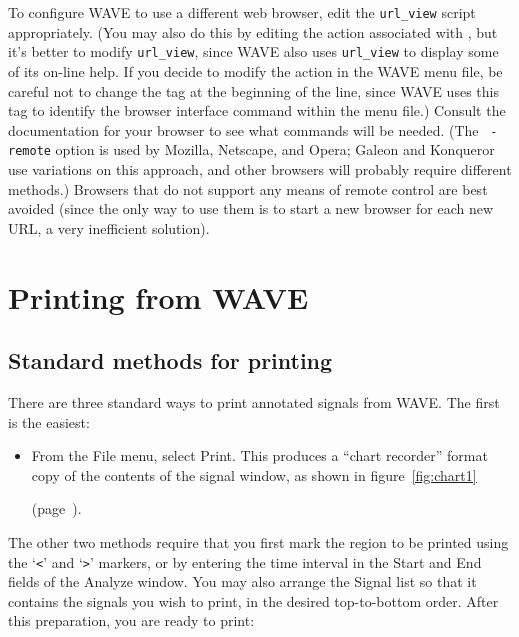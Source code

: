 \documentclass[twoside]{book}
\newcommand{\WAVE}{{\sf WAVE}\xspace}
\begin{document}
To configure \WAVE{} to use a different web browser, edit the {\tt url\_view}
script appropriately.  (You may also do this by editing the action associated
with {\tt <Open URL>}, but it's better to modify {\tt url\_view}, since \WAVE{}
also uses {\tt url\_view} to display some of its on-line help.  If you decide
to modify the action in the \WAVE{} menu file, be careful not to change the
{\tt <Open URL>} tag at the beginning of the line, since \WAVE{} uses this tag
to identify the browser interface command within the menu file.)  Consult the
documentation for your browser to see what commands will be needed.  (The {\tt
-remote} option is used by Mozilla, Netscape, and Opera;  Galeon and
Konqueror use variations on this approach, and other browsers will
probably require different methods.)  Browsers that do not support any means of
remote control are best avoided (since the only way to use them is to start a
new browser for each new URL, a very inefficient solution).

\chapter{Printing from \WAVE{}}

\label{ch:printing}
\section{Standard methods for printing}
There are three standard ways to print annotated signals from \WAVE{}.
The first is the easiest:

\begin{itemize}
\item
From the {\sf File} menu, select {\sf Print}.  This produces a ``chart
recorder'' format copy of the contents of the signal window, as shown
in figure~\ref{fig:chart1}
\begin{latexonly}
(page~\pageref{fig:chart1}).
\end{latexonly}
\end{itemize}

The other two methods require that you first mark the region to be
printed using the `{\tt <}' and `{\tt >}' markers, or by entering the
time interval in the {\sf Start} and {\sf End} fields of the {\sf
Analyze} window.  You may also arrange the {\sf Signal list} so that
it contains the signals you wish to print, in the desired top-to-bottom order.
After this preparation, you are ready to print:
\end{document}
